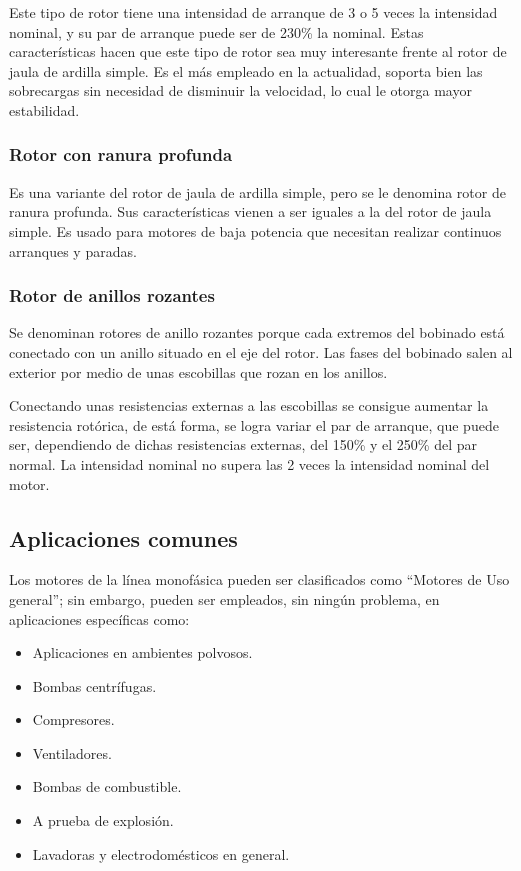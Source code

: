 \documentclass[a4paper,11pt]{article}
\begin{document}
Este tipo de rotor tiene una intensidad de arranque de 3 o 5 veces la intensidad nominal, y su par de arranque puede ser de 230\% la nominal. Estas características hacen que este tipo de rotor sea muy interesante frente al rotor de jaula de ardilla simple. Es el más empleado en la actualidad, soporta bien las sobrecargas sin necesidad de disminuir la velocidad, lo cual le otorga mayor estabilidad.
\subsubsection{Rotor con ranura profunda}
Es una variante del rotor de jaula de ardilla simple, pero se le denomina rotor de ranura profunda. Sus características vienen a ser iguales a la del rotor de jaula simple. Es usado para motores de baja potencia que necesitan realizar continuos arranques y paradas.
\subsubsection{Rotor de anillos rozantes}
Se denominan rotores de anillo rozantes porque cada extremos del bobinado está conectado con un anillo situado en el eje del rotor. Las fases del bobinado salen al exterior por medio de unas escobillas que rozan en los anillos.

Conectando unas resistencias externas a las escobillas se consigue aumentar la resistencia rotórica, de está forma, se logra variar el par de arranque, que puede ser, dependiendo de dichas resistencias externas, del 150\% y el 250\% del par normal. La intensidad nominal no supera las 2 veces la intensidad nominal del motor.
\subsection{Aplicaciones comunes}
Los motores de la línea monofásica pueden ser clasificados como ``Motores de Uso general''; sin embargo, pueden ser empleados, sin ningún problema, en aplicaciones específicas como:
\begin{itemize}
    \item Aplicaciones en ambientes polvosos.
    \item Bombas centrífugas.
    \item Compresores.
    \item Ventiladores.
    \item Bombas de combustible.
    \item A prueba de explosión.
    \item Lavadoras y electrodomésticos en general.
\end{itemize}
\end{document}
